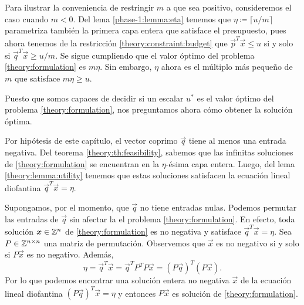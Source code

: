 \begin{observation}
	Para ilustrar la conveniencia de restringir $m$ a que sea positivo, consideremos el caso cuando
	$m < 0$. Del lema \ref{phase-1:lemma:eta} tenemos que $\eta \coloneq \lceil u/m \rceil$
	parametriza también la primera capa entera que satisface el presupuesto, pues ahora tenemos de
	la restricción \eqref{theory:constraint:budget} que $\vec{p}^T\vec{x} \leq u$ si y solo si
	$\vec{q}^T\vec{x} \geq u/m$. Se sigue cumpliendo que el valor óptimo del problema
	\eqref{theory:formulation} es $m\eta$. Sin embargo, $\eta$ ahora es el múltiplo más pequeño de $m$
	que satisface $m\eta \geq u$.
\end{observation}

Puesto que somos capaces de decidir si un escalar $u^*$ es el valor óptimo del problema
\eqref{theory:formulation}, nos preguntamos ahora cómo obtener la solución óptima.

Por hipótesis de este capítulo, el vector coprimo $\vec{q}$ tiene al menos una entrada negativa. Del
teorema \ref{theory:th:feasibility}, sabemos que las infinitas soluciones de
\eqref{theory:formulation} se encuentran en la $\eta$-ésima capa entera. Luego, del lema
\ref{theory:lemma:utility} tenemos que estas soluciones satisfacen la ecuación lineal diofantina
$\vec{q}^T\vec{x} = \eta$.

Supongamos, por el momento, que $\vec{q}$ no tiene entradas nulas. Podemos permutar las entradas de
$\vec{q}$ sin afectar la el problema \eqref{theory:formulation}. En efecto, toda solución $\boldsymbol{x}
\in \mathbb{Z}^n$ de \eqref{theory:formulation} es no negativa y satisface $\vec{q}^T\vec{x} = \eta$. Sea $P
\in \mathbb{Z}^{n \times n}$ una matriz de permutación. Observemos que $\vec{x}$ es no negativo si y solo si
$P\vec{x}$ es no negativo. Además,
\begin{equation*}
	\eta = \vec{q}^T\vec{x} = \vec{q}^TP^TP\vec{x} = (P\vec{q})^T(P\vec{x}).
\end{equation*}
Por lo que podemos encontrar una solución entera no negativa $\vec{x}$ de la ecuación lineal
diofantina $(P\vec{q})^T\vec{x} = \eta$ y entonces $P\vec{x}$ es solución de
\eqref{theory:formulation}.


